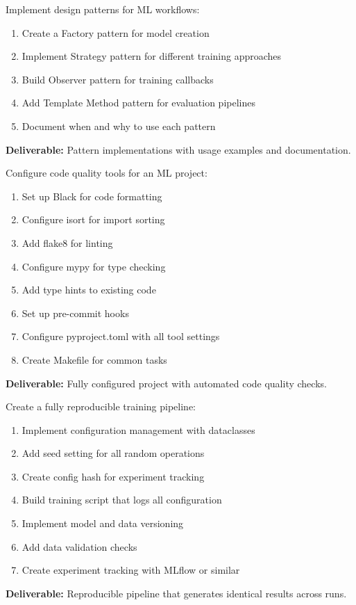 \begin{exercise}
Implement design patterns for ML workflows:
\begin{enumerate}
    \item Create a Factory pattern for model creation
    \item Implement Strategy pattern for different training approaches
    \item Build Observer pattern for training callbacks
    \item Add Template Method pattern for evaluation pipelines
    \item Document when and why to use each pattern
\end{enumerate}
\textbf{Deliverable:} Pattern implementations with usage examples and documentation.
\end{exercise}

\begin{exercise}
Configure code quality tools for an ML project:
\begin{enumerate}
    \item Set up Black for code formatting
    \item Configure isort for import sorting
    \item Add flake8 for linting
    \item Configure mypy for type checking
    \item Add type hints to existing code
    \item Set up pre-commit hooks
    \item Configure pyproject.toml with all tool settings
    \item Create Makefile for common tasks
\end{enumerate}
\textbf{Deliverable:} Fully configured project with automated code quality checks.
\end{exercise}

\begin{exercise}
Create a fully reproducible training pipeline:
\begin{enumerate}
    \item Implement configuration management with dataclasses
    \item Add seed setting for all random operations
    \item Create config hash for experiment tracking
    \item Build training script that logs all configuration
    \item Implement model and data versioning
    \item Add data validation checks
    \item Create experiment tracking with MLflow or similar
\end{enumerate}
\textbf{Deliverable:} Reproducible pipeline that generates identical results across runs.
\end{exercise}

